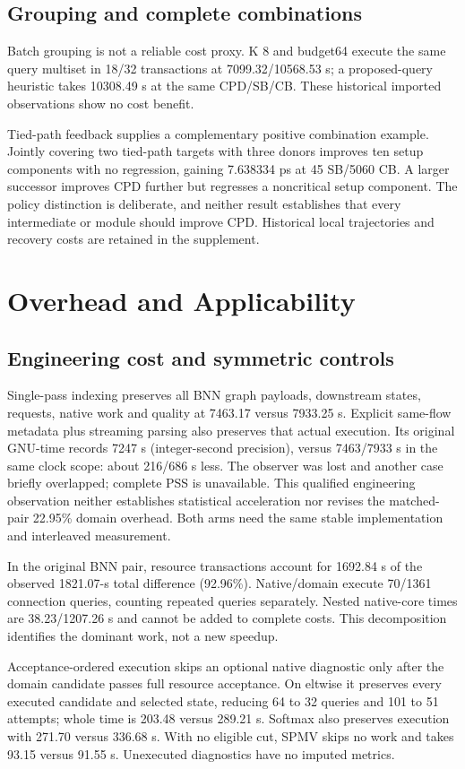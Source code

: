 \documentclass[conference,10pt]{IEEEtran}
\begin{document}
\subsection{Grouping and complete combinations}
Batch grouping is not a reliable cost proxy. K 8 and budget64 execute the same query multiset in 18/32 transactions at 7099.32/10568.53 s; a proposed-query heuristic takes 10308.49 s at the same CPD/SB/CB. These historical imported observations show no cost benefit.

Tied-path feedback supplies a complementary positive combination example. Jointly covering two tied-path targets with three donors improves ten setup components with no regression, gaining 7.638334 ps at 45 SB/5060 CB. A larger successor improves CPD further but regresses a noncritical setup component. The policy distinction is deliberate, and neither result establishes that every intermediate or module should improve CPD. Historical local trajectories and recovery costs are retained in the supplement.
\section{Overhead and Applicability}
\subsection{Engineering cost and symmetric controls}
Single-pass indexing preserves all BNN graph payloads, downstream states, requests, native work and quality at 7463.17 versus 7933.25 s. Explicit same-flow metadata plus streaming parsing also preserves that actual execution. Its original GNU-time records 7247 s (integer-second precision), versus 7463/7933 s in the same clock scope: about 216/686 s less. The observer was lost and another case briefly overlapped; complete PSS is unavailable. This qualified engineering observation neither establishes statistical acceleration nor revises the matched-pair 22.95\% domain overhead. Both arms need the same stable implementation and interleaved measurement.

In the original BNN pair, resource transactions account for 1692.84 s of the observed 1821.07-s total difference (92.96\%). Native/domain execute 70/1361 connection queries, counting repeated queries separately. Nested native-core times are 38.23/1207.26 s and cannot be added to complete costs. This decomposition identifies the dominant work, not a new speedup.

Acceptance-ordered execution skips an optional native diagnostic only after the domain candidate passes full resource acceptance. On eltwise it preserves every executed candidate and selected state, reducing 64 to 32 queries and 101 to 51 attempts; whole time is 203.48 versus 289.21 s. Softmax also preserves execution with 271.70 versus 336.68 s. With no eligible cut, SPMV skips no work and takes 93.15 versus 91.55 s. Unexecuted diagnostics have no imputed metrics.
\end{document}
